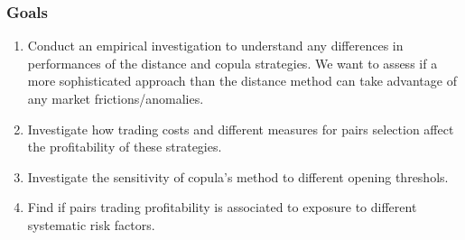 \documentclass[pdf,9pt,xcolor=dvipsnames,hide notes]{beamer}
\begin{document}
\begin{frame}[label=frame2]
\frametitle{Goals}

%

\begin{enumerate}[(1)]
\justifying

\item Conduct an empirical investigation to understand any differences in performances of the distance and copula strategies. We want to assess if a more sophisticated approach than the distance method can take advantage of any market frictions/anomalies.

\vspace{0.3cm}

\item Investigate how trading costs and different measures for pairs selection affect the profitability of these strategies.

\vspace{0.3cm}

\item Investigate the sensitivity of copula's method to different opening threshols.

\vspace{0.3cm}

\item Find if pairs trading profitability is associated to exposure to different systematic risk factors.

\end{enumerate}

\end{frame}
\end{document}
